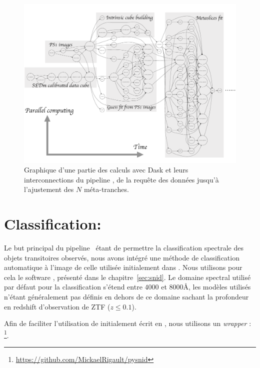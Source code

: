 \documentclass[../main/main.tex]{subfiles}
\begin{document}
\begin{landscape}
\begin{figure}
  \centering
  \includegraphics[width=1.0\linewidth]{../figures/07_scene/mydask.pdf}
  \caption{Graphique d'une partie des calculs avec Dask et leurs interconnections du
    pipeline \hypergal, de la requête des données jusqu'à l'ajustement des $N$ méta-tranches.}
  \label{fig:dask}
\end{figure}
\end{landscape}
\section{Classification: }\label{sec:snidclassification}

Le but principal du pipeline \hypergal\ étant de
permettre la classification spectrale des objets transitoires
observés, nous avons intégré une méthode de classification automatique à l'image de celle
utilisée initialement dans . Nous utilisons pour cela le
software , présenté dans le chapitre~\ref{sec:snid}. Le
domaine spectral utilisé par défaut pour la classification s'étend entre
$4000$ et $8000$\AA, les modèles utilisés n'étant généralement pas
définis en dehors de ce domaine sachant la profondeur en redshift
d'observation de ZTF ($z\leq0.1$). 

Afin de faciliter l'utilisation de  initialement écrit en
, nous utilisons un \textit{wrapper} :
\footnote{\url{https://github.com/MickaelRigault/pysnid}}.
\end{document}
